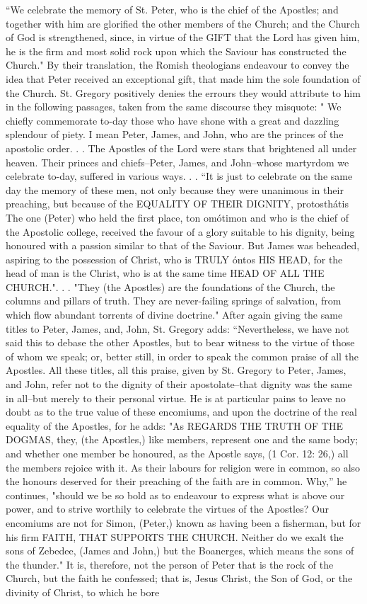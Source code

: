 “We celebrate the memory of St. Peter, who is the chief of the Apostles; and together with him are glorified the other members of the Church; and the Church of God is strengthened, since, in virtue of the GIFT that the Lord has given him, he is the firm and most solid rock upon which the Saviour has constructed the Church." By their translation, the Romish theologians endeavour to convey the idea that Peter received an exceptional gift, that made him the sole foundation of the Church. St. Gregory positively denies the errours they would attribute to him in the following passages, taken from the same discourse they misquote: " We chiefly commemorate to-day those who have shone with a great and dazzling splendour of piety. I mean Peter, James, and John, who are the princes of the apostolic order. . . The Apostles of the Lord were stars that brightened all under heaven. Their princes and chiefs--Peter, James, and John--whose martyrdom we celebrate to-day, suffered in various ways. . . “It is just to celebrate on the same day the memory of these men, not only because they were unanimous in their preaching, but because of the EQUALITY OF THEIR DIGNITY, protosthátis The one (Peter) who held the first place, ton omótimon and who is the chief of the Apostolic college, received the favour of a glory suitable to his dignity, being honoured with a passion similar to that of the Saviour. But James was beheaded, aspiring to the possession of Christ, who is TRULY óntos HIS HEAD, for the head of man is the Christ, who is at the same time HEAD OF ALL THE CHURCH.". . . "They (the Apostles) are the foundations of the Church, the columns and pillars of truth. They are never-failing springs of salvation, from which flow abundant torrents of divine doctrine." After again giving the same titles to Peter, James, and, John, St. Gregory adds: “Nevertheless, we have not said this to debase the other Apostles, but to bear witness to the virtue of those of whom we speak; or, better still, in order to speak the common praise of all the Apostles. All these titles, all this praise, given by St. Gregory to Peter, James, and John, refer not to the dignity of their apostolate--that dignity was the same in all--but merely to their personal virtue. He is at particular pains to leave no doubt as to the true value of these encomiums, and upon the doctrine of the real equality of the Apostles, for he adds: "As REGARDS THE TRUTH OF THE DOGMAS, they, (the Apostles,) like members, represent one and the same body; and whether one member be honoured, as the Apostle says, (1 Cor. 12: 26,) all the members rejoice with it. As their labours for religion were in common, so also the honours deserved for their preaching of the faith are in common. Why,” he continues, "should we be so bold as to endeavour to express what is above our power, and to strive worthily to celebrate the virtues of the Apostles? Our encomiums are not for Simon, (Peter,) known as having been a fisherman, but for his firm FAITH, THAT SUPPORTS THE CHURCH. Neither do we exalt the sons of Zebedee, (James and John,) but the Boanerges, which means the sons of the thunder." It is, therefore, not the person of Peter that is the rock of the Church, but the faith he confessed; that is, Jesus Christ, the Son of God, or the divinity of Christ, to which he bore 